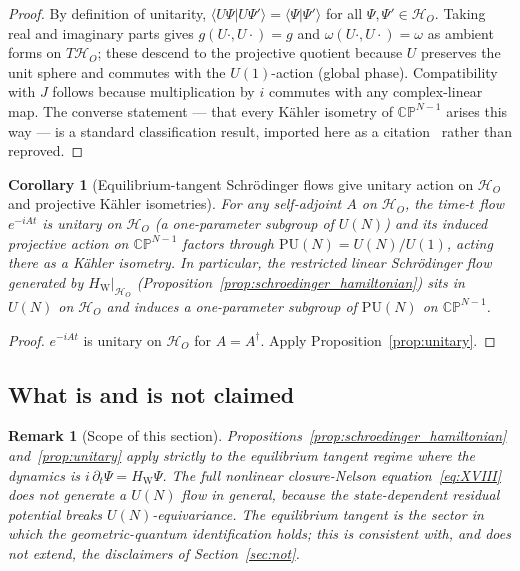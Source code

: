 \documentclass[12pt]{article}
\newtheorem{corollary}[theorem]{Corollary}
\newtheorem{remark}[theorem]{Remark}
\newcommand{\HW}{H_{\mathrm{W}}}
\begin{document}
\begin{proof}
By definition of unitarity, $\langle U\Psi|U\Psi'\rangle = \langle\Psi|\Psi'\rangle$ for all $\Psi, \Psi' \in \mathcal{H}_O$. Taking real and imaginary parts gives $g(U\cdot, U\cdot) = g$ and $\omega(U\cdot, U\cdot) = \omega$ as ambient forms on $T\mathcal{H}_O$; these descend to the projective quotient because $U$ preserves the unit sphere and commutes with the $U(1)$-action (global phase). Compatibility with $J$ follows because multiplication by $i$ commutes with any complex-linear map. The converse statement --- that every K\"ahler isometry of $\mathbb{CP}^{N-1}$ arises this way --- is a standard classification result, imported here as a citation~\citep{KobayashiNomizu1969} rather than reproved.
\end{proof}

\begin{corollary}[Equilibrium-tangent Schr\"odinger flows give unitary action on $\mathcal{H}_O$ and projective K\"ahler isometries]\label{cor:schroedinger_unitary}
For any self-adjoint $A$ on $\mathcal{H}_O$, the time-$t$ flow $e^{-iAt}$ is unitary on $\mathcal{H}_O$ (a one-parameter subgroup of $U(N)$) and its induced projective action on $\mathbb{CP}^{N-1}$ factors through $\mathrm{PU}(N) = U(N)/U(1)$, acting there as a K\"ahler isometry. In particular, the restricted linear Schr\"odinger flow generated by $\HW|_{\mathcal{H}_O}$ (Proposition~\ref{prop:schroedinger_hamiltonian}) sits in $U(N)$ on $\mathcal{H}_O$ and induces a one-parameter subgroup of $\mathrm{PU}(N)$ on $\mathbb{CP}^{N-1}$.
\end{corollary}

\begin{proof}
$e^{-iAt}$ is unitary on $\mathcal{H}_O$ for $A = A^\dagger$. Apply Proposition~\ref{prop:unitary}.
\end{proof}

\subsection{What is and is not claimed}\label{subsec:xxi_scope}

\begin{remark}[Scope of this section]\label{rem:scope_geometric}
Propositions~\ref{prop:schroedinger_hamiltonian} and~\ref{prop:unitary} apply strictly to the equilibrium tangent regime where the dynamics is $i\,\partial_t\Psi = \HW\Psi$. The full nonlinear closure-Nelson equation~\eqref{eq:XVIII} does \emph{not} generate a $U(N)$ flow in general, because the state-dependent residual potential breaks $U(N)$-equivariance. The equilibrium tangent is the sector in which the geometric-quantum identification holds; this is consistent with, and does not extend, the disclaimers of Section~\ref{sec:not}.
\end{remark}
\end{document}
